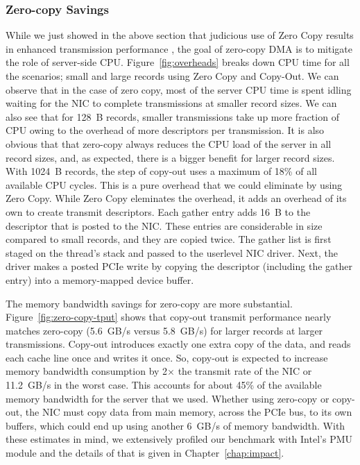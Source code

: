 \subsubsection{Zero-copy Savings}
\label{sec:overhead}


While we just showed in the above section that judicious use of Zero Copy results in  enhanced transmission performance
, the goal of zero-copy DMA is to mitigate the role of server-side CPU. Figure~\ref{fig:overheads} breaks down
CPU time for all the scenarios; small and large records using Zero Copy and Copy-Out. We can observe that in the case 
of zero copy, most of the server CPU time is spent idling waiting for the NIC 
to complete transmissions at smaller record sizes. We can also see that for 128~B records,
smaller transmissions take up more fraction of CPU owing to the overhead of more descriptors
per transmission. It is also obvious that that zero-copy always reduces 
the CPU load of the server in all record sizes, and, as expected, there is a bigger
benefit for larger record sizes. 
With 1024~B records, the \memcpy  step of copy-out uses a maximum of 18\% of all available
CPU cycles. This is a pure overhead that we could eliminate by using Zero Copy.
While Zero Copy eleminates the \memcpy overhead, it adds an overhead of its own to create  transmit descriptors.
Each gather entry adds 16~B to the descriptor that is posted to the NIC.
These entries are considerable in size compared to
small records, and they are copied twice. The gather list
is first staged on the thread's stack and passed to the userlevel NIC driver. Next,
the driver makes a posted PCIe write by copying the descriptor (including the
gather entry) into a memory-mapped device buffer.

The memory bandwidth savings for zero-copy are more substantial.
Figure~\ref{fig:zero-copy-tput} shows that copy-out transmit performance nearly
matches zero-copy (5.6~GB/s versus 5.8~GB/s) for larger records at larger transmissions. Copy-out introduces exactly one
extra copy of the data, and \memcpy  reads each cache line once and writes it
once. So, copy-out is expected to increase memory bandwidth consumption
by 2$\times$ the transmit rate of the NIC or 11.2~GB/s in the worst case.  This
accounts for about 45\% of the available memory bandwidth for the server that we used. Whether
using zero-copy or copy-out, the NIC must copy data from main memory, across the PCIe bus, to its own buffers, which
could end up using another 6~GB/s of memory bandwidth. With these estimates in mind, we extensively profiled
 our benchmark with Intel's PMU module and the details of that is given in Chapter~\ref{chap:impact}.

